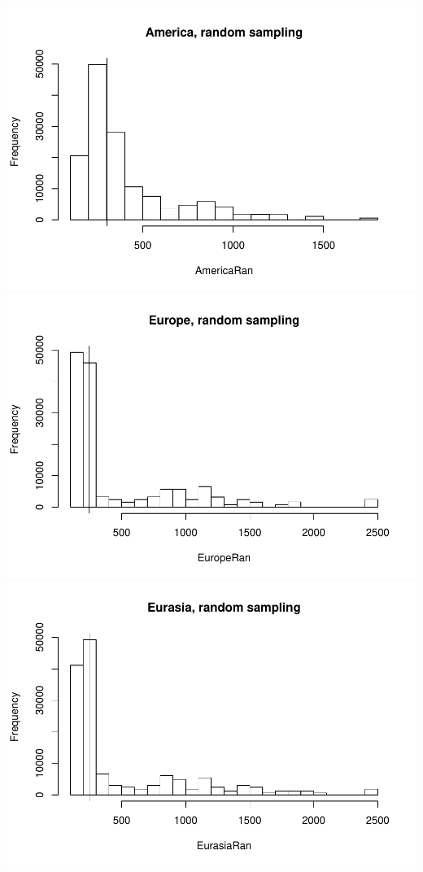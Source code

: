 \documentclass[]{article}
\begin{document}
\includegraphics{MA_JJ_files/figure-latex/randon sampling continents-1.pdf}
\includegraphics{MA_JJ_files/figure-latex/randon sampling continents-2.pdf}
\includegraphics{MA_JJ_files/figure-latex/randon sampling continents-3.pdf}
\end{document}
